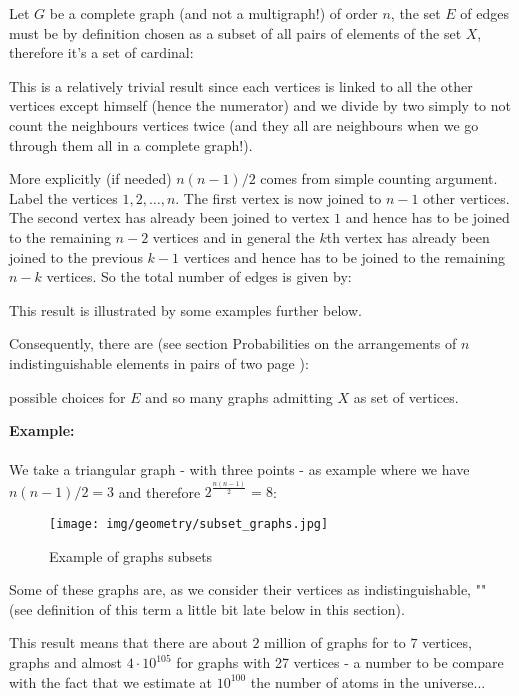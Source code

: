 {\begin{enumerate}
	Let $G$ be a complete graph (and not a multigraph!) of order $n$, the set $E$ of edges must be by definition chosen as a subset of all pairs of elements of the set $X$, therefore it's a set of cardinal:
	
	This is a relatively trivial result since each vertices is linked to all the other vertices except himself (hence the numerator) and we divide by two simply to not count the neighbours vertices twice (and they all are neighbours when we go through them all in a complete graph!).
	
	More explicitly (if needed) $n(n-1)/2$ comes from simple counting argument. Label the vertices $1,2,\ldots,n$. The first vertex is now joined to $n-1$ other vertices. The second vertex has already been joined to vertex $1$ and hence has to be joined to the remaining $n-2$ vertices and in general the $k$th vertex has already been joined to the previous $k-1$ vertices and hence has to be joined to the remaining $n-k$ vertices. So the total number of edges is given by:
	
	This result is illustrated by some examples further below.
	
	Consequently, there are (see section Probabilities on the arrangements  of $n$ indistinguishable elements in pairs of two page \pageref{simple arrangements with repetitions}):
	
	possible choices for $E$ and so many graphs admitting $X$ as set of vertices. 
	\begin{tcolorbox}[colframe=black,colback=white,sharp corners]
	\textbf{{\Large {}}Example:}\\\\
	We take a triangular graph - with three points - as example where we have $n(n-1)/2=3$ and therefore $2^{\frac{n(n-1)}{2}}=8$:
	\begin{figure}[H]
		\centering
		\texttt{[image: img/geometry/subset\_graphs.jpg]}
		\caption{Example of graphs subsets}
	\end{figure}
	\end{tcolorbox}
	
	 Some of these graphs are, as we consider their vertices as indistinguishable, "" (see definition of this term a little bit late below in this section).
	
	This result means that there are about $2$ million of graphs for to $7$ vertices, graphs and almost $4\cdot 10^{105}$ for graphs with 27 vertices - a number to be compare with the fact that we estimate at $10^{100}$ the number of atoms in the universe...
	

\end{enumerate}}
